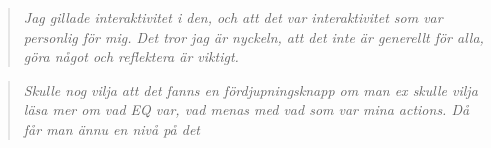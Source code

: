\begin{quotation}
\em  Jag gillade interaktivitet i den, och att det var interaktivitet som var personlig för mig. Det tror jag är nyckeln, att det inte är generellt för alla, göra något och reflektera är viktigt. 
\end{quotation}

\begin{quotation}
\em Skulle nog vilja att det fanns en fördjupningsknapp om man ex skulle vilja läsa mer om vad EQ var, vad menas med vad som var mina actions. Då får man ännu en nivå på det 
\end{quotation}




